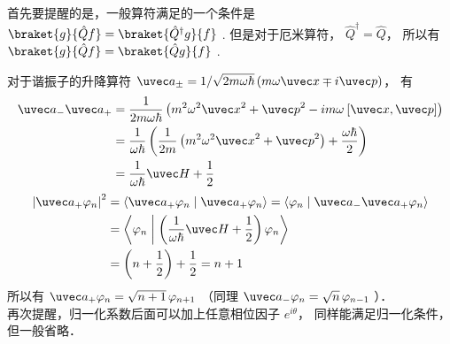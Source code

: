 首先要提醒的是，一般算符满足的一个条件是 $\braket{g}{\hat Q f}=\braket{\hat Q^\dagger g}{ f}$ . 但是对于厄米算符， ${\hat Q^\dagger } = \hat Q$，  所以有 $\braket{g}{\hat Q f} = \braket{\hat Q g}{f}$ .

对于谐振子的升降算符 ${\uvec a_ \pm } = {1}/{{\sqrt {2m\omega \hbar } }}\left( {m\omega \uvec x \mp i\uvec p} \right)$， 有
\begin{equation}\begin{aligned}
{\uvec a_ - }{\uvec a_ + } &= \frac{1}{{2m\omega \hbar }}\left( {{m^2}{\omega ^2}{{\uvec x}^2} + {{\uvec p}^2} - im\omega {\kern 1pt} {\kern 1pt} [\uvec x,\uvec p]} \right) \\
&= \frac{1}{{\omega \hbar }}\left( {\frac{1}{{2m}}\left( {{m^2}{\omega ^2}{{\uvec x}^2} + {{\uvec p}^2}} \right) + \frac{{\omega \hbar }}{2}} \right) \\
&= \frac{1}{{\omega \hbar }}\uvec H + \frac{1}{2}
\end{aligned}\end{equation}
\begin{equation}\begin{aligned}
{\left| {{{\uvec a}_ + }{\varphi _n}} \right|^2} &= \left\langle {{{{\uvec a}_ + }{\varphi _n}}}
\mathrel{\left | {\vphantom {{{{\uvec a}_ + }{\varphi _n}} {{{\uvec a}_ + }{\varphi _n}}}}
\right. \kern-\nulldelimiterspace}
{{{{\uvec a}_ + }{\varphi _n}}} \right\rangle = \left\langle {{{\varphi _n}}}
\mathrel{\left | {\vphantom {{{\varphi _n}} {{{\uvec a}_ - }{{\uvec a}_ + }{\varphi _n}}}}
\right. \kern-\nulldelimiterspace}
{{{{\uvec a}_ - }{{\uvec a}_ + }{\varphi _n}}} \right\rangle  \\
&= \left\langle {{{\varphi _n}}}
\mathrel{\left | {\vphantom {{{\varphi _n}} {\left( {\frac{1}{{\omega \hbar }}\uvec H + \frac{1}{2}} \right){\varphi _n}}}}
\right. \kern-\nulldelimiterspace}
{{\left( {\frac{1}{{\omega \hbar }}\uvec H + \frac{1}{2}} \right){\varphi _n}}} \right\rangle \\
&= \left( {n + \frac{1}{2}} \right) + \frac{1}{2} = n + 1
\end{aligned}\end{equation}
所以有 ${\uvec a_ + }{\varphi _n} = \sqrt {n + 1}\, {\varphi _{n + 1}}$ （同理 ${\uvec a_ - }{\varphi _n} = \sqrt n \,{\varphi _{n - 1}}$ ）．\\
再次提醒，归一化系数后面可以加上任意相位因子 ${e^{i\theta }}$， 同样能满足归一化条件，但一般省略．\\